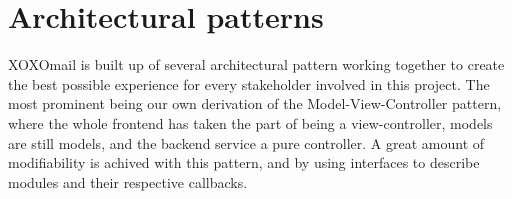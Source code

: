 \section{Architectural patterns}
	XOXOmail is built up of several architectural pattern working together to create the best possible experience for every stakeholder involved in this project. The most prominent being our own derivation of the Model-View-Controller pattern, where the whole frontend has taken the part of being a view-controller, models are still models, and the backend service a pure controller. A great amount of modifiability is achived with this pattern, and by using interfaces to describe modules and their respective callbacks. 